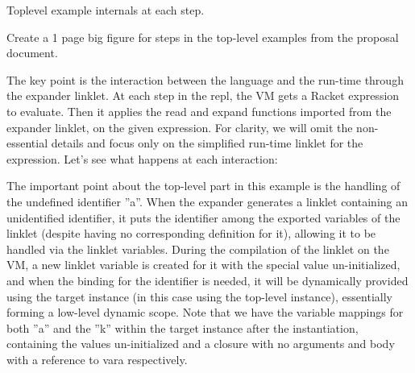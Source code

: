 		\begin{figure-here}
			Toplevel example internals at each step.

			\begin{todo}
				Create a 1 page big figure for steps in the top-level examples from the proposal document.
			\end{todo}
		\end{figure-here}

		\begin{paragraph-here}
			The key point is the interaction between the language and the run-time through the expander linklet. At each step in the repl, the VM gets a Racket expression to evaluate. Then it applies the read and expand functions imported from the expander linklet, on the given expression. For clarity, we will omit the non-essential details and focus only on the simplified run-time linklet for the expression. Let’s see what happens at each interaction:
		\end{paragraph-here}



		\begin{paragraph-here}
			The important point about the top-level part in this example is the handling of the undefined identifier ”a”. When the expander generates a linklet containing an unidentified identifier, it puts the identifier among the exported variables of the linklet (despite having no corresponding definition for it), allowing it to be handled via the linklet variables. During the compilation of the linklet on the VM, a new linklet variable is created for it with the special value un-initialized, and when the binding for the identifier is needed, it will be dynamically provided using the target instance (in this case using the top-level instance), essentially forming a low-level dynamic scope. Note that we have the variable mappings for both ”a” and the ”k” within the target instance after the instantiation, containing the values un-initialized and a closure with no arguments and body with a reference to vara respectively.
		\end{paragraph-here}


